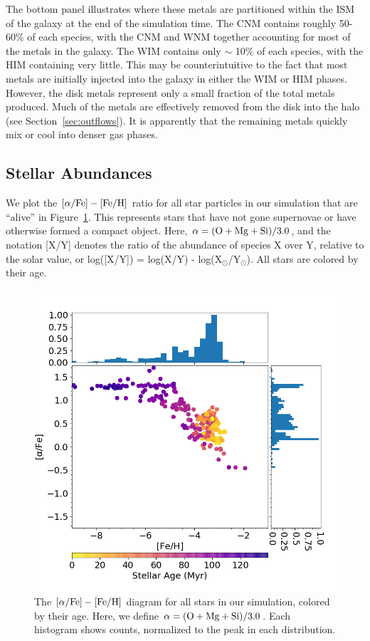 \documentclass[twocolumn]{aastex61}
\begin{document}
The bottom panel illustrates where these metals are partitioned within the ISM of the galaxy at the end of the simulation time. The CNM contains roughly 50-60\% of each species, with the CNM and WNM together accounting for most of the metals in the galaxy. The WIM contains only $\sim$ 10\% of each species, with the HIM containing very little. This may be counterintuitive to the fact that most metals are initially injected into the galaxy in either the WIM or HIM phases. However, the disk metals represent only a small fraction of the total metals produced. Much of the metals are effectively removed from the disk into the halo (see Section~\ref{sec:outflows}). It is apparently that the remaining metals quickly mix or cool into denser gas phases.

\subsection{Stellar Abundances}
\label{sec:stellar properties}
We plot the $[\alpha / {\rm Fe}]-[\rm{Fe}/\rm{H}]$ ratio for all star particles in our simulation that are ``alive'' in Figure~\ref{fig:stellar_abundance}. This represents stars that have not gone supernovae or have otherwise formed a compact object. Here, $\alpha = (\rm{O} + \rm{Mg} + \rm{Si})/3.0$, and the notation [X/Y] denotes the ratio of the abundance of species X over Y, relative to the solar value, or log([X/Y]) = log(X/Y) - log(X$_{\odot}$/Y$_{\odot}$). All stars are colored by their age.

\begin{figure}
\includegraphics[width=0.95\linewidth]{alpha_over_fe_hist}
\caption{The $[\alpha / {\rm Fe}]-[\rm{Fe}/\rm{H}]$
diagram for all stars in our simulation, colored by their age. Here, we define $\alpha = (\rm{O} + \rm{Mg} + \rm{Si})/3.0$. Each histogram shows counts, normalized to the peak in each distribution.}
\label{fig:stellar_abundance}
\end{figure}
\end{document}
